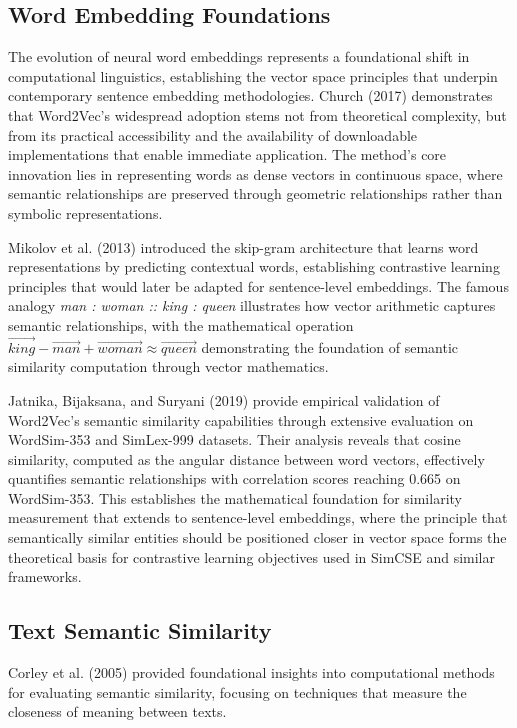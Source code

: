{\color{maroon}
\subsection{Word Embedding Foundations}

The evolution of neural word embeddings represents a foundational shift in computational linguistics, establishing the vector space principles that underpin contemporary sentence embedding methodologies. Church (2017) demonstrates that Word2Vec's widespread adoption stems not from theoretical complexity, but from its practical accessibility and the availability of downloadable implementations that enable immediate application. The method's core innovation lies in representing words as dense vectors in continuous space, where semantic relationships are preserved through geometric relationships rather than symbolic representations.

Mikolov et al. (2013) introduced the skip-gram architecture that learns word representations by predicting contextual words, establishing contrastive learning principles that would later be adapted for sentence-level embeddings. The famous analogy \textit{man : woman :: king : queen} illustrates how vector arithmetic captures semantic relationships, with the mathematical operation $\vec{king} - \vec{man} + \vec{woman} \approx \vec{queen}$ demonstrating the foundation of semantic similarity computation through vector mathematics.

Jatnika, Bijaksana, and Suryani (2019) provide empirical validation of Word2Vec's semantic similarity capabilities through extensive evaluation on WordSim-353 and SimLex-999 datasets. Their analysis reveals that cosine similarity, computed as the angular distance between word vectors, effectively quantifies semantic relationships with correlation scores reaching 0.665 on WordSim-353. This establishes the mathematical foundation for similarity measurement that extends to sentence-level embeddings, where the principle that semantically similar entities should be positioned closer in vector space forms the theoretical basis for contrastive learning objectives used in SimCSE and similar frameworks.
}

\subsection{Text Semantic Similarity}

Corley et al. (2005) provided foundational insights into computational methods for evaluating semantic similarity, focusing on techniques that measure the closeness of meaning between texts.


